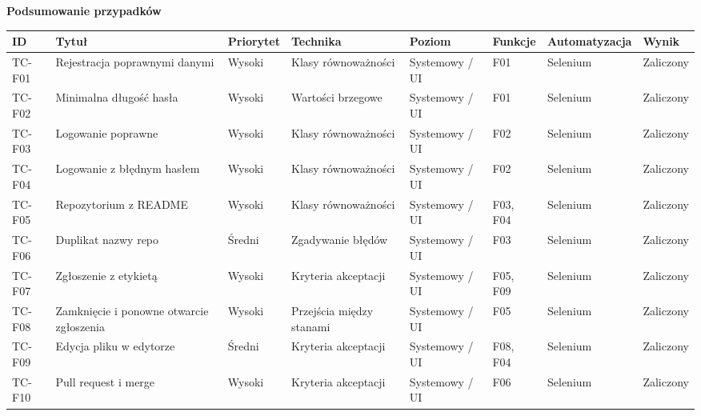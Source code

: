 \par\medskip\noindent\textbf{Podsumowanie przypadków}\par
{\scriptsize\setlength{\tabcolsep}{3pt}
\begin{longtable}{>{\raggedright\arraybackslash}p{}>{\raggedright\arraybackslash}p{}>{\raggedright\arraybackslash}p{}>{\raggedright\arraybackslash}p{}>{\raggedright\arraybackslash}p{}>{\raggedright\arraybackslash}p{}>{\raggedright\arraybackslash}p{}>{\raggedright\arraybackslash}p{}}
\toprule
\textbf{ID} & \textbf{Tytuł} & \textbf{Priorytet} & \textbf{Technika} & \textbf{Poziom} & \textbf{Funkcje} & \textbf{Automatyzacja} & \textbf{Wynik} \\
\midrule
\endhead
TC-F01 & Rejestracja poprawnymi danymi & Wysoki & Klasy równoważności & Systemowy / UI & F01 & Selenium & Zaliczony \\
TC-F02 & Minimalna długość hasła & Wysoki & Wartości brzegowe & Systemowy / UI & F01 & Selenium & Zaliczony \\
TC-F03 & Logowanie poprawne & Wysoki & Klasy równoważności & Systemowy / UI & F02 & Selenium & Zaliczony \\
TC-F04 & Logowanie z błędnym hasłem & Wysoki & Klasy równoważności & Systemowy / UI & F02 & Selenium & Zaliczony \\
TC-F05 & Repozytorium z README & Wysoki & Klasy równoważności & Systemowy / UI & F03, F04 & Selenium & Zaliczony \\
TC-F06 & Duplikat nazwy repo & Średni & Zgadywanie błędów & Systemowy / UI & F03 & Selenium & Zaliczony \\
TC-F07 & Zgłoszenie z etykietą & Wysoki & Kryteria akceptacji & Systemowy / UI & F05, F09 & Selenium & Zaliczony \\
TC-F08 & Zamknięcie i ponowne otwarcie zgłoszenia & Wysoki & Przejścia między stanami & Systemowy / UI & F05 & Selenium & Zaliczony \\
TC-F09 & Edycja pliku w edytorze & Średni & Kryteria akceptacji & Systemowy / UI & F08, F04 & Selenium & Zaliczony \\
TC-F10 & Pull request i merge & Wysoki & Kryteria akceptacji & Systemowy / UI & F06 & Selenium & Zaliczony \\

\end{longtable}}
